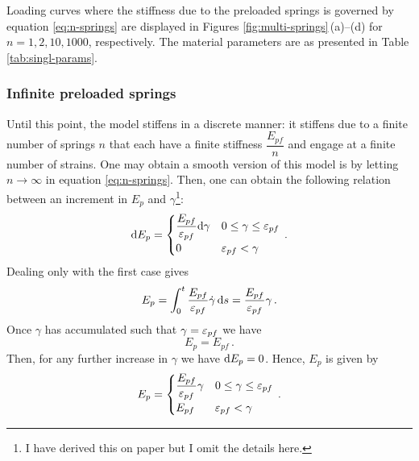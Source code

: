 \documentclass{article}
\begin{document}
Loading curves where the stiffness due to the preloaded springs is governed by equation \eqref{eq:n-springs} are displayed in Figures \ref{fig:multi-springs}\,(a)--(d) for $n=1,2,10,1000$, respectively. The material parameters are as presented in Table \ref{tab:singl-params}.


\subsubsection{Infinite preloaded springs}
Until this point, the model stiffens in a discrete manner: it stiffens due to a finite number of springs $n$ that each have a finite stiffness $\dfrac{E_{pf}}{n}$ and engage at a finite number of strains. One may obtain a smooth version of this model is by letting $n\rightarrow \infty$ in equation \eqref{eq:n-springs}. Then, one can obtain the following relation between an increment in $E_{p}$ and $\gamma$\footnote{I have derived this on paper but I omit the details here.}:
\begin{equation}
	\text{d} E_{p} = \begin{cases}
		\dfrac{E_{pf}}{\varepsilon_{pf}}\text{d} \gamma & 0 \leq \gamma \leq \varepsilon_{pf}\\
		0 & \varepsilon_{pf} < \gamma
	\end{cases}\,.
\label{eq:smooth-increments}
\end{equation}
Dealing only with the first case gives
\begin{equation}
	E_{p} = \int_{0}^{t}\dfrac{E_{pf}}{\varepsilon_{pf}}\dot{\gamma}\,\text{d} s = \dfrac{E_{pf}}{\varepsilon_{pf}} \gamma\,.
\end{equation}
Once $\gamma$ has accumulated such that $\gamma=\varepsilon_{pf}$ we have 
\begin{equation}
	E_{p} = E_{pf}\,.
\end{equation}
Then, for any further increase in $\gamma$ we have $\text{d} E_p=0$. Hence, $E_p$ is given by
\begin{equation}
	E_{p} = \begin{cases}
	\dfrac{E_{pf}}{\varepsilon_{pf}} \gamma & 0 \leq \gamma \leq \varepsilon_{pf}\\
	E_{pf} & \varepsilon_{pf} < \gamma
\end{cases}\,.
\end{equation}
\end{document}
